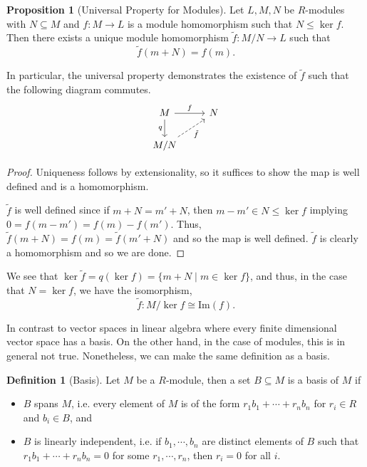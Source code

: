 \documentclass[]{article}
\theoremstyle{definition}
\theoremstyle{definition}
\newtheorem{definition}{Definition}[section]
\newtheorem{proposition}{Proposition}[section]
\begin{document}
\begin{proposition}[Universal Property for Modules]
  Let \(L, M, N\) be \(R\)-modules with \(N \subseteq M\) and \(f : M \to L\)
  is a module homomorphism such that \(N \le \ker f\). Then there exists a 
  unique module homomorphism \(\tilde f : M / N \to L\) such that 
  \[\tilde f(m + N) = f(m).\]
\end{proposition}
In particular, the universal property demonstrates the existence of \(\tilde f\) 
such that the following diagram commutes.
\[\begin{tikzcd}
  M \arrow[r, "f"] \arrow[swap, d, "q"] & N \\
  M / N \arrow[swap, dashed, ru, "\tilde f"]
  \end{tikzcd}\]
\begin{proof}
  Uniqueness follows by extensionality, so it suffices to show the map is 
  well defined and is a homomorphism. 
  
  \(\tilde f\) is well defined since if \(m + N = m' + N\), then 
  \(m - m' \in N \le \ker f\) implying \(0 = f(m - m') = f(m) - f(m')\).
  Thus, \(\tilde f(m + N) = f(m) = \tilde f(m' + N)\) and so the map is 
  well defined. \(\tilde f\) is clearly a homomorphism and so we are done.
\end{proof}

We see that \(\ker \tilde f = q(\ker f) = \{m + N \mid m \in \ker f\}\), and thus, 
in the case that \(N = \ker f\), we have the isomorphism, 
\[\tilde f : M / \ker f \cong \text{Im}(f).\] 

In contrast to vector spaces in linear algebra where every finite dimensional 
vector space has a basis. On the other hand, in the case of modules, this 
is in general not true. Nonetheless, we can make the same definition as a basis.

\begin{definition}[Basis]
  Let \(M\) be a \(R\)-module, then a set \(B \subseteq M\) is a basis of 
  \(M\) if 
  \begin{itemize}
    \item \(B\) spans \(M\), i.e. every element of \(M\) is of the form 
      \(r_1 b_1 + \cdots + r_n b_n\) for \(r_i \in R\) and \(b_i \in B\), and
    \item \(B\) is linearly independent, i.e. if \(b_1, \cdots, b_n\) are 
      distinct elements of \(B\) such that \(r_1 b_1 + \cdots + r_n b_n = 0\) 
      for some \(r_1, \cdots, r_n\), then \(r_i = 0\) for all \(i\).
  \end{itemize}
\end{definition}
\end{document}

